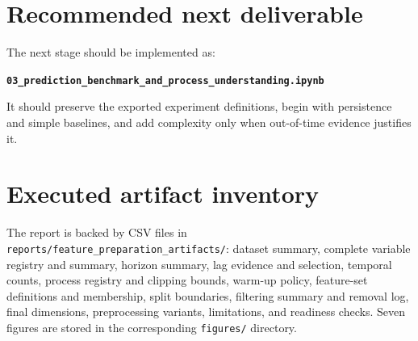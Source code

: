 \documentclass[10pt,a4paper]{article}
\begin{document}
\section{Recommended next deliverable}
The next stage should be implemented as:
\begin{center}
\Large\textbf{\texttt{03\_prediction\_benchmark\_and\_process\_understanding.ipynb}}
\end{center}
It should preserve the exported experiment definitions, begin with persistence and simple baselines, and add complexity only when out-of-time evidence justifies it.

\appendix
\section{Executed artifact inventory}
The report is backed by CSV files in \texttt{reports/feature\_preparation\_artifacts/}: dataset summary, complete variable registry and summary, horizon summary, lag evidence and selection, temporal counts, process registry and clipping bounds, warm-up policy, feature-set definitions and membership, split boundaries, filtering summary and removal log, final dimensions, preprocessing variants, limitations, and readiness checks. Seven figures are stored in the corresponding \texttt{figures/} directory.
\end{document}
